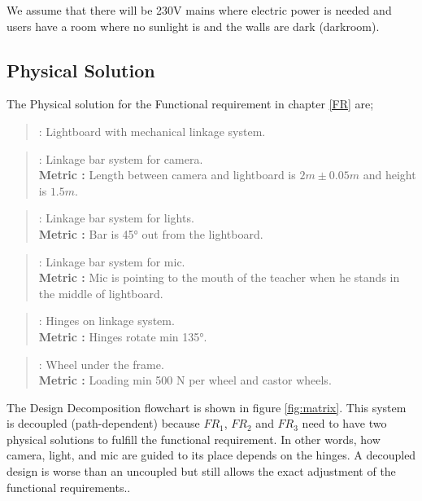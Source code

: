 \documentclass[a4paper]{jpconf}
\begin{document}
We assume that there will be 230V mains where electric power is needed and users have a room where no sunlight is and the walls are dark (darkroom).     %

\subsection{Physical Solution}\label{PS}
The Physical solution for the Functional requirement in chapter \ref{FR} are;
\begin{quote} 
	\textbf{} : Lightboard with mechanical linkage system.
\end{quote}

\begin{quote} 
	\textbf{} : Linkage bar system for camera. \\ 
	\textbf{Metric :} Length between camera and lightboard is $2 m \pm 0.05 m$ and height is $1.5 m$.
\end{quote}

\begin{quote} 
	\textbf{} : Linkage bar system for lights.
	\\ \textbf{Metric :} Bar is 45° out from the lightboard.
\end{quote}

\begin{quote} 
	\textbf{} : Linkage bar system for mic.
	\\ \textbf{Metric :} Mic is pointing to the mouth of the teacher when he stands in the middle of lightboard.
\end{quote}

\begin{quote} 
	\textbf{} : Hinges on linkage system.
	\\ \textbf{Metric :} Hinges rotate min 135°.
\end{quote}

\begin{quote} 
	\textbf{} : Wheel under the frame.
	\\ \textbf{Metric :} Loading min 500 N per wheel and castor wheels.
\end{quote}

The Design Decomposition flowchart is shown in figure \ref{fig:matrix}.
This system is decoupled (path-dependent) because $FR_1$, $FR_2$ and $FR_3$ need to have two physical solutions to fulfill the functional requirement.
In other words, how camera, light, and mic are guided to its place depends on the hinges.
A decoupled design is worse than an uncoupled but still allows the exact adjustment of the functional requirements.\cite{system_design}.
\end{document}
